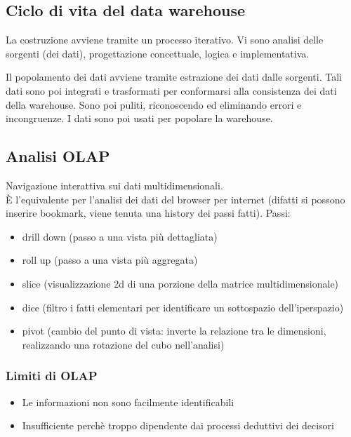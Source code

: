\subsection{Ciclo di vita del data warehouse}\label{ciclo-di-vita-del-data-warehouse}

La costruzione avviene tramite un processo iterativo. Vi sono analisi
delle sorgenti (dei dati), progettazione concettuale, logica e
implementativa.

Il popolamento dei dati avviene tramite estrazione dei dati dalle
sorgenti. Tali dati sono poi integrati e trasformati per conformarsi
alla consistenza dei dati della warehouse. Sono poi puliti, riconoscendo
ed eliminando errori e incongruenze. I dati sono poi usati per popolare
la warehouse.

\subsection{Analisi OLAP}\label{analisi-olap}

Navigazione interattiva sui dati multidimensionali.\\
\`E l'equivalente per l'analisi dei dati del browser per internet (difatti si possono inserire bookmark, viene tenuta una history dei passi fatti). Passi:

\begin{itemize}

\item
  drill down (passo a una vista pi\`u dettagliata)
\item
  roll up (passo a una vista pi\`u aggregata)
\item
  slice (visualizzazione 2d di una porzione della matrice
  multidimensionale)
\item
  dice (filtro i fatti elementari per identificare un sottospazio
  dell'iperspazio)
\item
  pivot (cambio del punto di vista: inverte la relazione tra le dimensioni, realizzando una rotazione del cubo nell'analisi)
\end{itemize}

\subsubsection{Limiti di OLAP}\label{limiti-di-olap}

\begin{itemize}

\item
  Le informazioni non sono facilmente identificabili
\item
  Insufficiente perch\`e troppo dipendente dai processi deduttivi dei decisori
\end{itemize}

